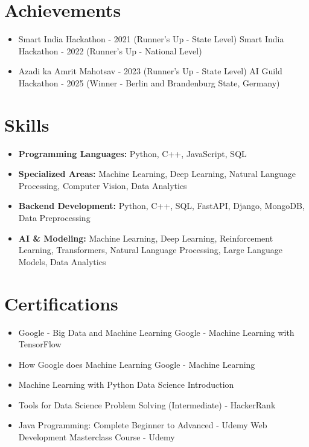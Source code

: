 \documentclass[a4paper,10pt]{article}
\begin{document}
\section*{Achievements}
\begin{itemize}
\item Smart India Hackathon - 2021 (Runner's Up - State Level) \hfill Smart India Hackathon - 2022 (Runner's Up - National Level)
\item Azadi ka Amrit Mahotsav - 2023 (Runner's Up - State Level) \hfill AI Guild Hackathon - 2025 (Winner - Berlin and Brandenburg State, Germany)
\end{itemize}

\section*{Skills}
\begin{itemize}
  \item \textbf{Programming Languages:} Python, C++, JavaScript, SQL
  \item \textbf{Specialized Areas:} Machine Learning, Deep Learning, Natural Language Processing, Computer Vision, Data Analytics
  \item \textbf{Backend Development:} Python, C++, SQL, FastAPI, Django, MongoDB, Data Preprocessing
  \item \textbf{AI \& Modeling:} Machine Learning, Deep Learning, Reinforcement Learning, Transformers, Natural Language Processing, Large Language Models, Data Analytics
\end{itemize}

\section*{Certifications}
\begin{itemize}
\item Google - Big Data and Machine Learning \hfill Google - Machine Learning with TensorFlow
\item How Google does Machine Learning \hfill Google - Machine Learning
\item Machine Learning with Python \hfill Data Science Introduction
\item Tools for Data Science \hfill Problem Solving (Intermediate) - HackerRank
\item Java Programming: Complete Beginner to Advanced - Udemy \hfill Web Development Masterclass Course - Udemy
\end{itemize}
\end{document}

